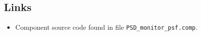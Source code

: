 \subsection*{Links}
\begin{itemize}
  \item Component source code found in file \texttt{PSD\_monitor\_psf.comp}.
\end{itemize}
